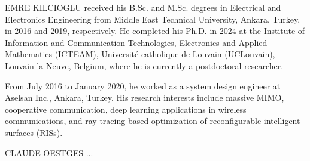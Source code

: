 \documentclass{IEEEoj}
\begin{document}
\begin{IEEEbiography}{EMRE KILCIOGLU } received his B.Sc. and M.Sc. degrees in Electrical and Electronics Engineering from Middle East Technical University, Ankara, Turkey, in 2016 and 2019, respectively. He completed his Ph.D. in 2024 at the Institute of Information and Communication Technologies, Electronics and Applied Mathematics (ICTEAM), Université catholique de Louvain (UCLouvain), Louvain-la-Neuve, Belgium, where he is currently a postdoctoral researcher.
	
From July 2016 to January 2020, he worked as a system design engineer at Aselsan Inc., Ankara, Turkey. His research interests include massive MIMO, cooperative communication, deep learning applications in wireless communications, and ray-tracing-based optimization of reconfigurable intelligent surfaces (RISs).
\end{IEEEbiography}

\begin{IEEEbiography}{CLAUDE OESTGES } ...
\end{IEEEbiography}
\end{document}
